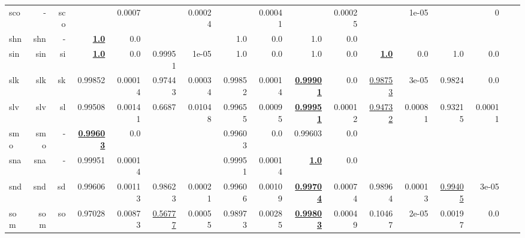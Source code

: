 \documentclass[11pt]{article}
\begin{document}
\begin{table*}[h]
{\begin{tabular}{lrrrrrrrrrrrrrrrr}
sco         & -         & sco         &          & 0.0007         &          & 0.00024         &          & 0.00041         &          & 0.00025         &          & 1e-05         &          & 0         \\
shn         & shn         & -         & \textbf{\underline{1.0}}         & 0.0         &          &          & 1.0         & 0.0         & 1.0         & 0.0         &          &          &          &          \\
sin         & sin         & si         & \textbf{\underline{1.0}}         & 0.0         & 0.99951         & 1e-05         & 1.0         & 0.0         & 1.0         & 0.0         & \textbf{\underline{1.0}}         & 0.0         & 1.0         & 0.0         \\
slk         & slk         & sk         & 0.99852         & 0.00014         & 0.97443         & 0.00034         & 0.99852         & 0.00014         & \textbf{\underline{0.99901}}         & 0.0         & \underline{0.98753}         & 3e-05         & 0.9824         & 0.0         \\
slv         & slv         & sl         & 0.99508         & 0.00141         & 0.6687         & 0.01048         & 0.99655         & 0.00095         & \textbf{\underline{0.99951}}         & 0.00012         & \underline{0.94732}         & 0.00081         & 0.93215         & 0.00011         \\
smo         & smo         & -         & \textbf{\underline{0.99603}}         & 0.0         &          &          & 0.99603         & 0.0         & 0.99603         & 0.0         &          &          &          &          \\
sna         & sna         & -         & 0.99951         & 0.00014         &          &          & 0.99951         & 0.00014         & \textbf{\underline{1.0}}         & 0.0         &          &          &          &          \\
snd         & snd         & sd         & 0.99606         & 0.00113         & 0.98623         & 0.00021         & 0.99606         & 0.00109         & \textbf{\underline{0.99704}}         & 0.00074         & 0.98964         & 0.00013         & \underline{0.99405}         & 3e-05         \\
som         & som         & so         & 0.97028         & 0.00873         & \underline{0.56777}         & 0.00055         & 0.98973         & 0.00285         & \textbf{\underline{0.99803}}         & 0.00049         & 0.10467         & 2e-05         & 0.00197         & 0.0         \\

\end{tabular}}
\end{table*}
\end{document}
